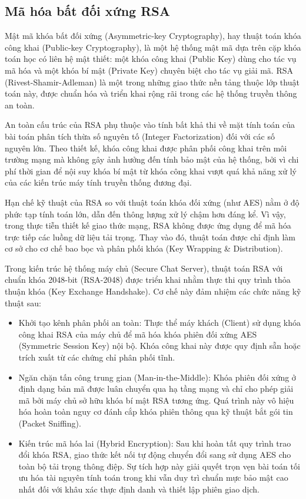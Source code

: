 \subsection{Mã hóa bất đối xứng RSA}

Mật mã khóa bất đối xứng (Asymmetric-key Cryptography), hay thuật toán khóa công khai (Public-key Cryptography), là một hệ thống mật mã dựa trên cặp khóa toán học có liên hệ mật thiết: một khóa công khai (Public Key) dùng cho tác vụ mã hóa và một khóa bí mật (Private Key) chuyên biệt cho tác vụ giải mã. RSA (Rivest-Shamir-Adleman) là một trong những giao thức nền tảng thuộc lớp thuật toán này, được chuẩn hóa và triển khai rộng rãi trong các hệ thống truyền thông an toàn.

An toàn cấu trúc của RSA phụ thuộc vào tính bất khả thi về mặt tính toán của bài toán phân tích thừa số nguyên tố (Integer Factorization) đối với các số nguyên lớn. Theo thiết kế, khóa công khai được phân phối công khai trên môi trường mạng mà không gây ảnh hưởng đến tính bảo mật của hệ thống, bởi vì chi phí thời gian để nội suy khóa bí mật từ khóa công khai vượt quá khả năng xử lý của các kiến trúc máy tính truyền thống đương đại.

Hạn chế kỹ thuật của RSA so với thuật toán khóa đối xứng (như AES) nằm ở độ phức tạp tính toán lớn, dẫn đến thông lượng xử lý chậm hơn đáng kể. Vì vậy, trong thực tiễn thiết kế giao thức mạng, RSA không được ứng dụng để mã hóa trực tiếp các luồng dữ liệu tải trọng. Thay vào đó, thuật toán được chỉ định làm cơ sở cho cơ chế bao bọc và phân phối khóa (Key Wrapping \& Distribution).

Trong kiến trúc hệ thống máy chủ (Secure Chat Server), thuật toán RSA với chuẩn khóa 2048-bit (RSA-2048) được triển khai nhằm thực thi quy trình thỏa thuận khóa (Key Exchange Handshake). Cơ chế này đảm nhiệm các chức năng kỹ thuật sau:
\begin{itemize}[label={-}]
    \item Khởi tạo kênh phân phối an toàn: Thực thể máy khách (Client) sử dụng khóa công khai RSA của máy chủ để mã hóa khóa phiên đối xứng AES (Symmetric Session Key) nội bộ. Khóa công khai này được quy định sẵn hoặc trích xuất từ các chứng chỉ phân phối tĩnh.
    \item Ngăn chặn tấn công trung gian (Man-in-the-Middle): Khóa phiên đối xứng ở định dạng bản mã được luân chuyển qua hạ tầng mạng và chỉ cho phép giải mã bởi máy chủ sở hữu khóa bí mật RSA tương ứng. Quá trình này vô hiệu hóa hoàn toàn nguy cơ đánh cắp khóa phiên thông qua kỹ thuật bắt gói tin (Packet Sniffing).
    \item Kiến trúc mã hóa lai (Hybrid Encryption): Sau khi hoàn tất quy trình trao đổi khóa RSA, giao thức kết nối tự động chuyển đổi sang sử dụng AES cho toàn bộ tải trọng thông điệp. Sự tích hợp này giải quyết trọn vẹn bài toán tối ưu hóa tài nguyên tính toán trong khi vẫn duy trì chuẩn mực bảo mật cao nhất đối với khâu xác thực định danh và thiết lập phiên giao dịch.
\end{itemize}
